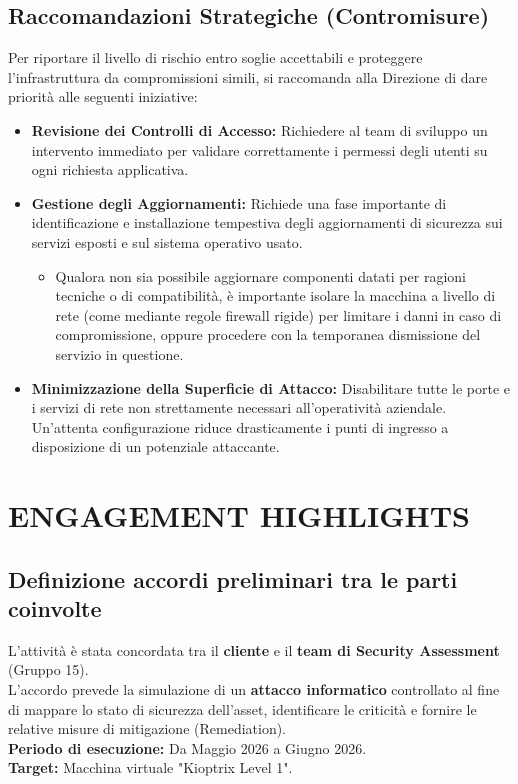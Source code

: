 \documentclass[12pt, a4paper]{article}
\begin{document}
	\newpage
	\subsection{Raccomandazioni Strategiche (Contromisure)}

	Per riportare il livello di rischio entro soglie accettabili e proteggere l'infrastruttura da compromissioni simili, si raccomanda alla Direzione di dare priorità alle seguenti iniziative: 
	\begin{itemize}
		\item \textbf{Revisione dei Controlli di Accesso:} Richiedere al team di sviluppo un intervento immediato per validare correttamente i permessi degli utenti su ogni richiesta applicativa.
		\item \textbf{Gestione degli Aggiornamenti:} Richiede una fase importante di identificazione e installazione tempestiva degli aggiornamenti di sicurezza sui servizi esposti e sul sistema operativo usato.
		\begin{itemize}
			\item[*] Qualora non sia possibile aggiornare componenti datati per ragioni tecniche o di compatibilità, è importante isolare la macchina a livello di rete (come mediante regole firewall rigide) per limitare i danni in caso di compromissione, oppure procedere con la temporanea dismissione del servizio in questione.
 		\end{itemize}
		\item \textbf{Minimizzazione della Superficie di Attacco:} Disabilitare tutte le porte e i servizi di rete non strettamente necessari all'operatività aziendale. Un'attenta configurazione riduce drasticamente i punti di ingresso a disposizione di un potenziale attaccante. 
	\end{itemize}



	\newpage
	\section{ENGAGEMENT HIGHLIGHTS}

	\subsection{Definizione accordi preliminari tra le parti coinvolte}
	L'attività è stata concordata tra il \textbf{cliente} e il \textbf{team di Security Assessment} (Gruppo 15).\\ 
	L'accordo prevede la simulazione di un \textbf{attacco informatico} controllato al fine di mappare lo stato di sicurezza dell'asset, identificare le criticità e fornire le relative misure di mitigazione (Remediation).\\
	\vspace{0.5 cm}
	\textbf{Periodo di esecuzione:} Da Maggio 2026 a Giugno 2026.\\
	\vspace{0.5 cm}
	\textbf{Target:} Macchina virtuale "Kioptrix Level 1".
\end{document}
